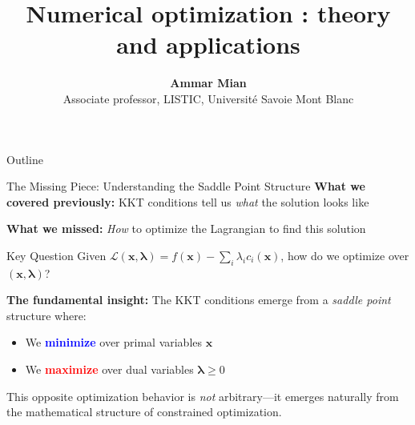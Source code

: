\documentclass[aspectratio=1610]{beamer}
\title[Numerical optimization]{Numerical optimization : theory and applications}
\date[]{}
\author[AM]{\textbf{Ammar Mian} \\ \footnotesize Associate professor, LISTIC, Université Savoie Mont Blanc}
\begin{document}


  
\begin{frame}
\titlepage
\end{frame}
\begingroup
{}
\begin{frame}{Outline}
    \tableofcontents[]
\end{frame}

\endgroup






\begin{frame}{The Missing Piece: Understanding the Saddle Point Structure}
  \textbf{What we covered previously:} KKT conditions tell us \emph{what} the solution looks like
  
  \vspace{0.3cm}
  \textbf{What we missed:} \emph{How} to optimize the Lagrangian to find this solution
  
  \vspace{0.5cm}
  \begin{block}{Key Question}
    Given $\mathcal{L}(\mathbf{x}, \boldsymbol{\lambda}) = f(\mathbf{x}) - \sum_{i} \lambda_i c_i(\mathbf{x})$, how do we optimize over $(\mathbf{x}, \boldsymbol{\lambda})$?
  \end{block}
  
  \vspace{0.3cm}
  \textbf{The fundamental insight:} The KKT conditions emerge from a \emph{saddle point} structure where:
  \begin{itemize}
    \item We \textcolor{blue}{\textbf{minimize}} over primal variables $\mathbf{x}$
    \item We \textcolor{red}{\textbf{maximize}} over dual variables $\boldsymbol{\lambda} \geq 0$
  \end{itemize}
  
  \vspace{0.3cm}
  This opposite optimization behavior is \emph{not} arbitrary---it emerges naturally from the mathematical structure of constrained optimization.
\end{frame}
\end{document}
